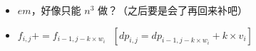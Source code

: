 \documentclass[E:/GsjzTle/main/main.tex]{subfiles}
\begin{document}
\begin{itemize}
\item
  \(em\)，好像只能 \(n^3\) 做？（之后要是会了再回来补吧）
\item
  \(f_{i,j} += f_{i - 1,j - k\times w_i}~~~[dp_{i,j} = dp_{i-1,j-k\times w_i}+k\times v_i]\)
\end{itemize}
\end{document}

